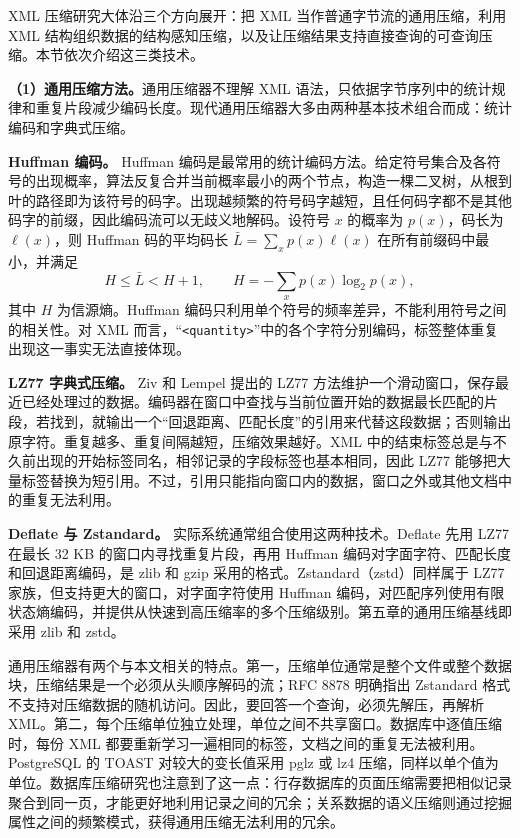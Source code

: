 XML 压缩研究大体沿三个方向展开：把 XML 当作普通字节流的通用压缩，利用 XML 结构组织数据的结构感知压缩，以及让压缩结果支持直接查询的可查询压缩\cite{sakr2009xml}。本节依次介绍这三类技术。

\textbf{（1）通用压缩方法。}通用压缩器不理解 XML 语法，只依据字节序列中的统计规律和重复片段减少编码长度\cite{jayasankar2021survey}。现代通用压缩器大多由两种基本技术组合而成：统计编码和字典式压缩。

\textbf{Huffman 编码。} Huffman 编码是最常用的统计编码方法\cite{huffman1952method}。给定符号集合及各符号的出现概率，算法反复合并当前概率最小的两个节点，构造一棵二叉树，从根到叶的路径即为该符号的码字。出现越频繁的符号码字越短，且任何码字都不是其他码字的前缀，因此编码流可以无歧义地解码。设符号 $x$ 的概率为 $p(x)$，码长为 $\ell(x)$，则 Huffman 码的平均码长 $\bar L=\sum_x p(x)\ell(x)$ 在所有前缀码中最小，并满足
\[
H\le\bar L<H+1,\qquad H=-\sum_x p(x)\log_2 p(x),
\]
其中 $H$ 为信源熵。Huffman 编码只利用单个符号的频率差异，不能利用符号之间的相关性。对 XML 而言，“\texttt{<quantity>}”中的各个字符分别编码，标签整体重复出现这一事实无法直接体现。

\textbf{LZ77 字典式压缩。} Ziv 和 Lempel 提出的 LZ77 方法维护一个滑动窗口，保存最近已经处理过的数据\cite{ziv1977universal}。编码器在窗口中查找与当前位置开始的数据最长匹配的片段，若找到，就输出一个“回退距离、匹配长度”的引用来代替这段数据；否则输出原字符。重复越多、重复间隔越短，压缩效果越好。XML 中的结束标签总是与不久前出现的开始标签同名，相邻记录的字段标签也基本相同，因此 LZ77 能够把大量标签替换为短引用。不过，引用只能指向窗口内的数据，窗口之外或其他文档中的重复无法利用。

\textbf{Deflate 与 Zstandard。} 实际系统通常组合使用这两种技术。Deflate 先用 LZ77 在最长 32 KB 的窗口内寻找重复片段，再用 Huffman 编码对字面字符、匹配长度和回退距离编码，是 zlib 和 gzip 采用的格式\cite{deutsch1996rfc1951}。Zstandard（zstd）同样属于 LZ77 家族，但支持更大的窗口，对字面字符使用 Huffman 编码，对匹配序列使用有限状态熵编码，并提供从快速到高压缩率的多个压缩级别\cite{collet2021rfc8878}。第五章的通用压缩基线即采用 zlib 和 zstd。

通用压缩器有两个与本文相关的特点。第一，压缩单位通常是整个文件或整个数据块，压缩结果是一个必须从头顺序解码的流；RFC 8878 明确指出 Zstandard 格式不支持对压缩数据的随机访问\cite{collet2021rfc8878}。因此，要回答一个查询，必须先解压，再解析 XML。第二，每个压缩单位独立处理，单位之间不共享窗口。数据库中逐值压缩时，每份 XML 都要重新学习一遍相同的标签，文档之间的重复无法被利用。PostgreSQL 的 TOAST 对较大的变长值采用 pglz 或 lz4 压缩，同样以单个值为单位\cite{pg16toast}。数据库压缩研究也注意到了这一点：行存数据库的页面压缩需要把相似记录聚合到同一页，才能更好地利用记录之间的冗余\cite{chen2025page}；关系数据的语义压缩则通过挖掘属性之间的频繁模式，获得通用压缩无法利用的冗余\cite{darwish2016improving}。

